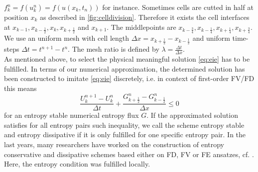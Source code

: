 $
	f^n_k = f(u^n_k) = f(u(x_k, t_n))
$
for instance. Sometimes cells are cutted in half at position $x_k$ as described in \cref{fig:celldivision}. Therefore  it exists the cell interfaces at $x_{k-1}, x_{k-\frac 1 2}, x_k, x_{k + \frac 1 2}$ and $x_{k+1}$. The middlepoints are  $x_{k-\frac 3 4}, x_{k-\frac 1 4}, x_{k+\frac 1 4}, x_{k+\frac 3 4}$.
We use an uniform mesh with cell length $\Delta x=x_{k+ \frac 12}-x_{k - \frac 12}$ and uniform time-steps $\Delta t= t^{n+1}-t^n$. The mesh ratio is defined by $\lambda= \frac{\Delta t} {\Delta x}$.\\
As mentioned above, to select the physical meaningful solution \eqref{eq:eie} has to be fulfilled.  In terms of our numerical approximation,
the determined solution has been constructed to imitate \eqref{eq:eie} discretely, i.e. in context of first-order FV/FD this means
\[
    \frac{U^{n+1}_k - U^{n}_k}{\Delta t} + \frac{G^n_{k+ \frac 1 2} - G^n_{k-\frac 1 2}}{\Delta x} \leq 0
\]
for an entropy stable numerical entropy flux $G$. 
If the approximated solution satisfies for all entropy pairs such inequality, we call the scheme entropy stable and entropy dissipative if it is only fulfilled for one specific entropy pair. In the last years, many researchers have worked on the construction of entropy conservative and dissipative schemes based either on FD, FV or FE ansatzes, cf. \cite{abgrall2018general, abgrall2021analysis, abgrall2022reinterpretation, chan2018discretely, chen2020review, fisher2013discretely, offner2018stability, ranocha2016summation}. Here, the entropy condition was fulfilled locally.  



